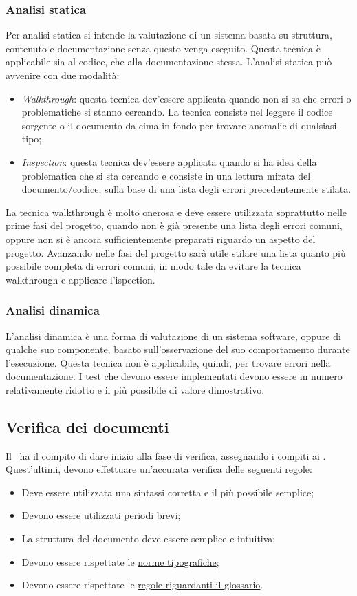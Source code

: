 \documentclass[../NormeProgetto.tex]{subfiles}
\begin{document}
			\subsubsection{Analisi statica} Per analisi statica si intende la valutazione di un sistema basata su struttura, contenuto e documentazione senza questo venga eseguito. Questa tecnica è applicabile sia al codice, che alla documentazione stessa. L'analisi statica può avvenire con due modalità:
			\begin{itemize}
				\item \textit{Walkthrough}: questa tecnica dev'essere applicata quando non si sa che errori o problematiche si stanno cercando. La tecnica consiste nel leggere il codice sorgente o il documento da cima in fondo per trovare anomalie  di qualsiasi tipo;
				\item \textit{Inspection}: questa tecnica dev'essere applicata quando si ha idea della problematica che si sta cercando e consiste in una lettura mirata del documento/codice, sulla base di una lista degli errori precedentemente stilata.
			\end{itemize}
			La tecnica walkthrough è molto onerosa e deve essere utilizzata soprattutto nelle prime fasi del progetto, quando non è già presente una lista degli errori comuni, oppure non si è ancora sufficientemente preparati riguardo un aspetto del progetto. Avanzando nelle fasi del progetto sarà utile stilare una lista quanto più possibile completa di errori comuni, in modo tale da evitare la tecnica walkthrough e applicare l'ispection.
			\subsubsection{Analisi dinamica}
			L’analisi dinamica è una forma di valutazione di un sistema software, oppure di qualche suo componente, basato sull'osservazione del suo comportamento durante l'esecuzione. Questa tecnica non è applicabile, quindi, per trovare errori nella documentazione. I test che devono essere implementati devono essere in numero relativamente ridotto e il più possibile di valore dimostrativo.
		\subsection{Verifica dei documenti}
		Il \responsabilediprogetto\ ha il compito di dare inizio alla fase di verifica, assegnando i compiti ai \verificatori. Quest'ultimi, devono effettuare un'accurata verifica delle seguenti regole:
		\begin{itemize}
			\item Deve essere utilizzata una sintassi corretta e il più possibile semplice;
			\item Devono essere utilizzati periodi brevi;
			\item La struttura del documento deve essere semplice e intuitiva;
			\item Devono essere rispettate le  \hyperref[sec:Norme tipografiche]{norme tipografiche};
			\item Devono essere rispettate le \hyperref[sec:Glossario]{regole riguardanti il glossario}.
		\end{itemize}
\end{document}
